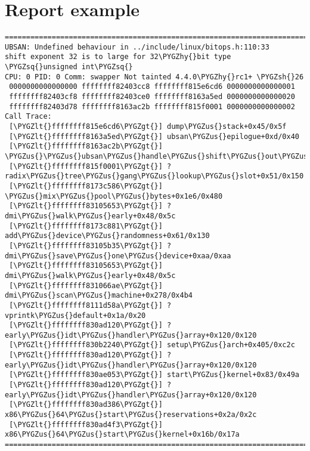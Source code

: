 \documentclass[a4paper,8pt,english]{sphinxmanual}
\def\PYGZus{\char`\_}
\def\PYGZlt{\char`\<}
\def\PYGZgt{\char`\>}
\def\PYGZsh{\char`\#}
\def\PYGZhy{\char`\-}
\def\PYGZsq{\char`\'}
\renewcommand\PYGZsq{\textquotesingle}
\begin{document}
\section{Report example}
\label{dev-tools/ubsan:report-example}
\begin{Verbatim}[commandchars=\\\{\}]
================================================================================
UBSAN: Undefined behaviour in ../include/linux/bitops.h:110:33
shift exponent 32 is to large for 32\PYGZhy{}bit type \PYGZsq{}unsigned int\PYGZsq{}
CPU: 0 PID: 0 Comm: swapper Not tainted 4.4.0\PYGZhy{}rc1+ \PYGZsh{}26
 0000000000000000 ffffffff82403cc8 ffffffff815e6cd6 0000000000000001
 ffffffff82403cf8 ffffffff82403ce0 ffffffff8163a5ed 0000000000000020
 ffffffff82403d78 ffffffff8163ac2b ffffffff815f0001 0000000000000002
Call Trace:
 [\PYGZlt{}ffffffff815e6cd6\PYGZgt{}] dump\PYGZus{}stack+0x45/0x5f
 [\PYGZlt{}ffffffff8163a5ed\PYGZgt{}] ubsan\PYGZus{}epilogue+0xd/0x40
 [\PYGZlt{}ffffffff8163ac2b\PYGZgt{}] \PYGZus{}\PYGZus{}ubsan\PYGZus{}handle\PYGZus{}shift\PYGZus{}out\PYGZus{}of\PYGZus{}bounds+0xeb/0x130
 [\PYGZlt{}ffffffff815f0001\PYGZgt{}] ? radix\PYGZus{}tree\PYGZus{}gang\PYGZus{}lookup\PYGZus{}slot+0x51/0x150
 [\PYGZlt{}ffffffff8173c586\PYGZgt{}] \PYGZus{}mix\PYGZus{}pool\PYGZus{}bytes+0x1e6/0x480
 [\PYGZlt{}ffffffff83105653\PYGZgt{}] ? dmi\PYGZus{}walk\PYGZus{}early+0x48/0x5c
 [\PYGZlt{}ffffffff8173c881\PYGZgt{}] add\PYGZus{}device\PYGZus{}randomness+0x61/0x130
 [\PYGZlt{}ffffffff83105b35\PYGZgt{}] ? dmi\PYGZus{}save\PYGZus{}one\PYGZus{}device+0xaa/0xaa
 [\PYGZlt{}ffffffff83105653\PYGZgt{}] dmi\PYGZus{}walk\PYGZus{}early+0x48/0x5c
 [\PYGZlt{}ffffffff831066ae\PYGZgt{}] dmi\PYGZus{}scan\PYGZus{}machine+0x278/0x4b4
 [\PYGZlt{}ffffffff8111d58a\PYGZgt{}] ? vprintk\PYGZus{}default+0x1a/0x20
 [\PYGZlt{}ffffffff830ad120\PYGZgt{}] ? early\PYGZus{}idt\PYGZus{}handler\PYGZus{}array+0x120/0x120
 [\PYGZlt{}ffffffff830b2240\PYGZgt{}] setup\PYGZus{}arch+0x405/0xc2c
 [\PYGZlt{}ffffffff830ad120\PYGZgt{}] ? early\PYGZus{}idt\PYGZus{}handler\PYGZus{}array+0x120/0x120
 [\PYGZlt{}ffffffff830ae053\PYGZgt{}] start\PYGZus{}kernel+0x83/0x49a
 [\PYGZlt{}ffffffff830ad120\PYGZgt{}] ? early\PYGZus{}idt\PYGZus{}handler\PYGZus{}array+0x120/0x120
 [\PYGZlt{}ffffffff830ad386\PYGZgt{}] x86\PYGZus{}64\PYGZus{}start\PYGZus{}reservations+0x2a/0x2c
 [\PYGZlt{}ffffffff830ad4f3\PYGZgt{}] x86\PYGZus{}64\PYGZus{}start\PYGZus{}kernel+0x16b/0x17a
================================================================================
\end{Verbatim}
\end{document}
